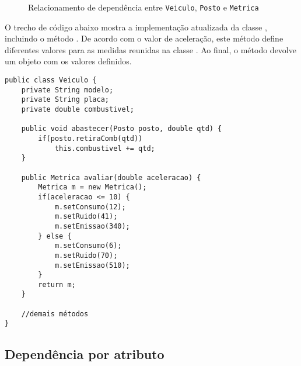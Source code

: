 \begin{figure}[h]
	\centering
	
	
	\caption{Relacionamento de dependência entre \texttt{Veiculo}, \texttt{Posto} e \texttt{Metrica}}
	\label{fig:dependencia-veiculo-posto-metrica}
	\end{figure}

O trecho de código abaixo mostra a implementação atualizada da classe , incluindo o método . De acordo com o valor de aceleração, este método define diferentes valores para as medidas reunidas na classe . Ao final, o método devolve um objeto  com os valores definidos.

\begin{verbatim}
public class Veiculo {
	private String modelo;
	private String placa;
	private double combustivel;
	
	public void abastecer(Posto posto, double qtd) {
		if(posto.retiraComb(qtd))
			this.combustivel += qtd;
	}
	
	public Metrica avaliar(double aceleracao) {
		Metrica m = new Metrica();
		if(aceleracao <= 10) {
			m.setConsumo(12);
			m.setRuido(41);
			m.setEmissao(340);
		} else {
			m.setConsumo(6);
			m.setRuido(70);
			m.setEmissao(510);
		}
		return m;
	}
	
	//demais métodos
}
\end{verbatim}

\subsection{Dependência por atributo}

